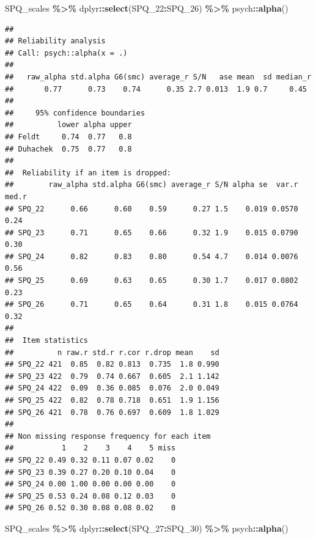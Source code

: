 \documentclass[
]{article}
\newenvironment{Shaded}{\begin{snugshade}}{\end{snugshade}}
\newcommand{\FunctionTok}[1]{\textcolor[rgb]{0.13,0.29,0.53}{\textbf{#1}}}
\newcommand{\NormalTok}[1]{#1}
\newcommand{\SpecialCharTok}[1]{\textcolor[rgb]{0.81,0.36,0.00}{\textbf{#1}}}
\begin{document}
\begin{Shaded}
\begin{Highlighting}[]
\NormalTok{SPQ\_scales }\SpecialCharTok{\%\textgreater{}\%}\NormalTok{ dplyr}\SpecialCharTok{::}\FunctionTok{select}\NormalTok{(SPQ\_22}\SpecialCharTok{:}\NormalTok{SPQ\_26) }\SpecialCharTok{\%\textgreater{}\%}\NormalTok{ psych}\SpecialCharTok{::}\FunctionTok{alpha}\NormalTok{()}
\end{Highlighting}
\end{Shaded}

\begin{verbatim}
## 
## Reliability analysis   
## Call: psych::alpha(x = .)
## 
##   raw_alpha std.alpha G6(smc) average_r S/N   ase mean  sd median_r
##       0.77      0.73    0.74      0.35 2.7 0.013  1.9 0.7     0.45
## 
##     95% confidence boundaries 
##          lower alpha upper
## Feldt     0.74  0.77   0.8
## Duhachek  0.75  0.77   0.8
## 
##  Reliability if an item is dropped:
##        raw_alpha std.alpha G6(smc) average_r S/N alpha se  var.r med.r
## SPQ_22      0.66      0.60    0.59      0.27 1.5    0.019 0.0570  0.24
## SPQ_23      0.71      0.65    0.66      0.32 1.9    0.015 0.0790  0.30
## SPQ_24      0.82      0.83    0.80      0.54 4.7    0.014 0.0076  0.56
## SPQ_25      0.69      0.63    0.65      0.30 1.7    0.017 0.0802  0.23
## SPQ_26      0.71      0.65    0.64      0.31 1.8    0.015 0.0764  0.32
## 
##  Item statistics 
##          n raw.r std.r r.cor r.drop mean    sd
## SPQ_22 421  0.85  0.82 0.813  0.735  1.8 0.990
## SPQ_23 422  0.79  0.74 0.667  0.605  2.1 1.142
## SPQ_24 422  0.09  0.36 0.085  0.076  2.0 0.049
## SPQ_25 422  0.82  0.78 0.718  0.651  1.9 1.156
## SPQ_26 421  0.78  0.76 0.697  0.609  1.8 1.029
## 
## Non missing response frequency for each item
##           1    2    3    4    5 miss
## SPQ_22 0.49 0.32 0.11 0.07 0.02    0
## SPQ_23 0.39 0.27 0.20 0.10 0.04    0
## SPQ_24 0.00 1.00 0.00 0.00 0.00    0
## SPQ_25 0.53 0.24 0.08 0.12 0.03    0
## SPQ_26 0.52 0.30 0.08 0.08 0.02    0
\end{verbatim}

\begin{Shaded}
\begin{Highlighting}[]
\NormalTok{SPQ\_scales }\SpecialCharTok{\%\textgreater{}\%}\NormalTok{ dplyr}\SpecialCharTok{::}\FunctionTok{select}\NormalTok{(SPQ\_27}\SpecialCharTok{:}\NormalTok{SPQ\_30) }\SpecialCharTok{\%\textgreater{}\%}\NormalTok{ psych}\SpecialCharTok{::}\FunctionTok{alpha}\NormalTok{()}
\end{Highlighting}
\end{Shaded}
\end{document}

